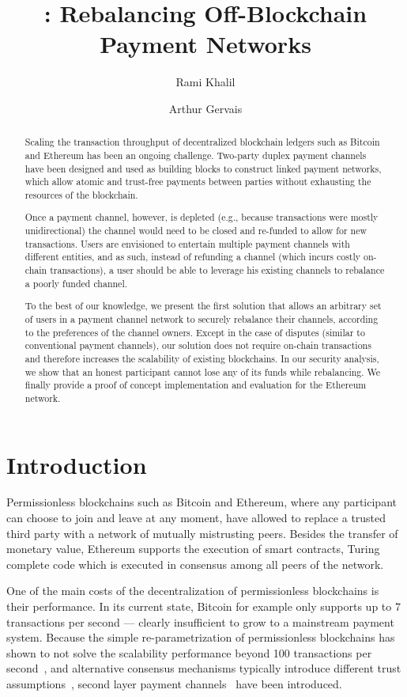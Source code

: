 \documentclass[sigconf]{acmart}
\title{\name: Rebalancing Off-Blockchain Payment Networks}
\date{}
\author{Rami Khalil}
\affiliation{%
  \institution{Department of Computer Science\\ETH Zurich, Switzerland}
}
\author{Arthur Gervais}
\affiliation{%
  \institution{Department of Computer Science\\ETH Zurich, Switzerland}
}
\begin{document}
\begin{abstract}
Scaling the transaction throughput of decentralized blockchain ledgers such as Bitcoin and Ethereum has been an ongoing challenge. Two-party duplex payment channels have been designed and used as building blocks to construct linked payment networks, which allow atomic and trust-free payments between parties without exhausting the resources of the blockchain.

Once a payment channel, however, is depleted (e.g., because transactions were mostly unidirectional) the channel would need to be closed and re-funded to allow for new transactions. Users are envisioned to entertain multiple payment channels with different entities, and as such, instead of refunding a channel (which incurs costly on-chain transactions), a user should be able to leverage his existing channels to rebalance a poorly funded channel.

To the best of our knowledge, we present the first solution that allows an arbitrary set of users in a payment channel network to securely rebalance their channels, according to the preferences of the channel owners. Except in the case of disputes (similar to conventional payment channels), our solution does not require on-chain transactions and therefore increases the scalability of existing blockchains. In our security analysis, we show that an honest participant cannot lose any of its funds while rebalancing. We finally provide a proof of concept implementation and evaluation for the Ethereum network.
\end{abstract}

\maketitle

\section{Introduction}
Permissionless blockchains such as Bitcoin and Ethereum, where any participant can choose to join and leave at any moment, have allowed to replace a trusted third party with a network of mutually mistrusting peers. Besides the transfer of monetary value, Ethereum supports the execution of smart contracts, Turing complete code which is executed in consensus among all peers of the network.

One of the main costs of the decentralization of permissionless blockchains is their performance. In its current state, Bitcoin for example only supports up to 7 transactions per second --- clearly insufficient to grow to a mainstream payment system. Because the simple re-parametrization of permissionless blockchains has shown to not solve the scalability performance beyond 100 transactions per second~\cite{gervais2016security}, and alternative consensus mechanisms typically introduce different trust assumptions~\cite{luu2015scp,kogias2016enhancing,eyal2016bitcoin,pass2016hybrid}, second layer payment channels~\cite{lightning, sprites, raiden, flare} have been introduced.
\end{document}
